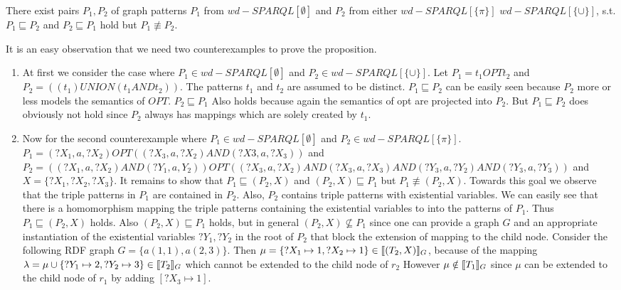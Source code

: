 \begin{proposition}
	There exist pairs $P_1,P_2$ of graph patterns $P_1$ from
	$wd-SPARQL[\emptyset]$ and $P_2$ from either $wd-SPARQL[\{\pi\}]$
	$wd-SPARQL[\{\cup\}]$, s.t. $P_1 \sqsubseteq P_2$ and $P_2 \sqsubseteq P_1$
	hold but $P_1 \not\equiv P_2$.
\end{proposition}
\begin{proofidea}
	It is an easy observation that we need two counterexamples to prove the
	proposition. 
	\begin{enumerate}	
		\item At first we consider the case where  $P_1 \in
			wd-SPARQL[\emptyset]$ and  $P_2 \in wd-SPARQL[\{\cup\}]$. Let $P_1 = t_1 OPT
			t_2$ and $P_2 = ((t_1) UNION (t_1 AND t_2))$. The patterns $t_1$ and $t_2$
			are assumed to be distinct.
			$P_1 \sqsubseteq P_2$ can be easily seen because $P_2$ more or less models
			the semantics of $OPT$. $P_2 \sqsubseteq P_1$ Also holds because again the
			semantics of opt are projected into $P_2$. But $P_1 \sqsubseteq P_2$ does
			obviously not hold since $P_2$ always has mappings which are solely created by
			$t_1$.
		\item 
			Now for the second counterexample where  $P_1 \in
			wd-SPARQL[\emptyset]$ and  $P_2 \in wd-SPARQL[\{\pi\}]$. 
			$P_1 = (?X_1,a,?X_2) OPT ((?X_3,a,?X_2) AND (?X3,a,?X_3))$
			and
			$P_2 = ((?X_1,a,?X_2) AND (?Y_1,a,Y_2)) OPT ((?X_3,a,?X_2) AND
			(?X_3,a,?X_3) AND (?Y_3,a,?Y_2) AND (?Y_3,a,?Y_3))$ and $X =
			\{?X_1,?X_2,?X_3\}$.
			It remains to show that $P_1 \sqsubseteq (P_2,X)$ and $(P_2,X)
			\sqsubseteq P_1$ but $P_1 \not\equiv (P_2,X)$.
		    Towards this goal we observe that the triple patterns in $P_1$ are
			contained in $P_2$. Also, $P_2$ contains triple patterns with
			existential variables. We can easily see that there is a
			homomorphism mapping the triple patterns containing the existential
			variables to into the
			patterns of $P_1$. Thus $P_1 \sqsubseteq (P_2,X)$ holds. Also
			$(P_2,X) \sqsubseteq P_1$ holds, but in general $(P_2,X) \not\subseteq
			P_1$ since one can provide a graph $G$ and an appropriate
			instantiation of the existential variables $?Y_1, ?Y_2$ in the root
			of $P_2$ that block the extension of mapping to the child node.
			Consider the following RDF graph $G = \{ a(1,1), a(2,3)\}$. Then
			$\mu = \{?X_1 \mapsto 1, ?X_2 \mapsto 1\} \in \llbracket (T_2,X)\rrbracket_G$,
			because of the mapping $\lambda = \mu \cup \{ ?Y_1 \mapsto 2,
			?Y_2\mapsto 3 \} \in \llbracket T_2 \rrbracket_G$ which cannot be extended to the
			child node of $r_2$ However $\mu \notin \llbracket T_1\rrbracket_G$ since $\mu$
			can be extended to the child node of $r_1$ by adding $[?X_3 \mapsto
		1]$.
			
	\end{enumerate}
\end{proofidea}
